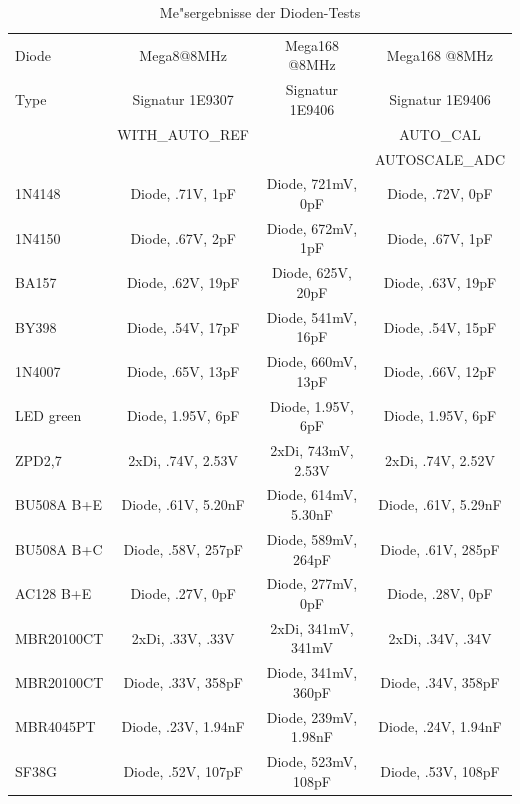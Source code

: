 \begin{table}[H]
  \begin{center}
    \begin{tabular}{| l | c | c | c |}
    \hline
     Diode & Mega8@8MHz          & Mega168 @8MHz       & Mega168 @8MHz     \\
     Type  & Signatur 1E9307     & Signatur 1E9406     & Signatur 1E9406   \\
           & WITH\_AUTO\_REF     &                     & AUTO\_CAL         \\
           &                     &                     & AUTOSCALE\_ADC    \\
    \hline
    \hline
1N4148     & Diode, .71V, 1pF    & Diode, 721mV, 0pF   & Diode, .72V, 0pF  \\
    \hline
1N4150     & Diode, .67V, 2pF    & Diode, 672mV, 1pF   & Diode, .67V, 1pF  \\
    \hline
BA157      & Diode, .62V, 19pF   & Diode, 625V, 20pF   & Diode, .63V, 19pF \\
    \hline
BY398      & Diode, .54V, 17pF   & Diode, 541mV, 16pF  & Diode, .54V, 15pF \\
    \hline
1N4007     & Diode, .65V, 13pF   & Diode, 660mV, 13pF  & Diode, .66V, 12pF \\
    \hline
LED green  & Diode, 1.95V, 6pF   & Diode, 1.95V, 6pF   & Diode, 1.95V, 6pF \\
    \hline
ZPD2,7     & 2xDi, .74V, 2.53V   & 2xDi, 743mV, 2.53V  & 2xDi, .74V, 2.52V \\
    \hline
BU508A B+E & Diode, .61V, 5.20nF & Diode, 614mV, 5.30nF & Diode, .61V, 5.29nF\\
    \hline
BU508A B+C & Diode, .58V, 257pF  & Diode, 589mV, 264pF & Diode, .61V, 285pF\\
    \hline
AC128 B+E  & Diode, .27V, 0pF    & Diode, 277mV, 0pF   & Diode, .28V, 0pF  \\
    \hline
MBR20100CT & 2xDi, .33V, .33V    & 2xDi, 341mV, 341mV  & 2xDi, .34V, .34V  \\
    \hline
MBR20100CT & Diode, .33V, 358pF  & Diode, 341mV, 360pF & Diode, .34V, 358pF\\
    \hline
MBR4045PT  & Diode, .23V, 1.94nF & Diode, 239mV, 1.98nF & Diode, .24V, 1.94nF\\
    \hline
SF38G      & Diode, .52V, 107pF  & Diode, 523mV, 108pF & Diode, .53V, 108pF\\
    \hline
    \end{tabular}
  \end{center}
  \caption{Me"sergebnisse der Dioden-Tests}
  \label{tab:diodes} 
\end{table}

